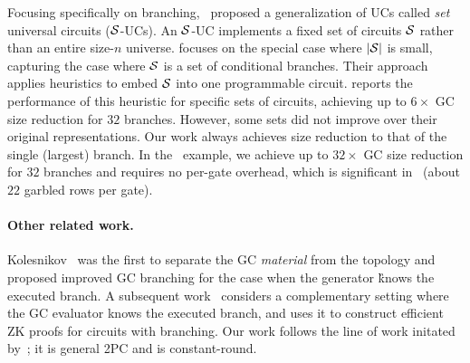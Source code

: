 Focusing specifically on branching,~\cite{AC:KenKolWil17} proposed a generalization of UCs called \emph{set} universal circuits ($\cal S$-UCs).
An $\cal S$-UC implements a fixed set of circuits $\cal S$ rather than an entire size-$n$ universe.
\cite{AC:KenKolWil17} focuses on the special case where $|\cal S|$ is small, capturing the case where $\cal S$ is a set of conditional branches.
Their approach applies heuristics to embed $\cal S$ into one programmable circuit.
\cite{AC:KenKolWil17} reports the performance of this heuristic for specific sets of circuits, achieving up to $6\times$ GC size reduction for $32$ branches.
However, some sets did not improve over their original representations.  Our work always achieves size reduction to that of the single (largest) branch. In the~\cite{AC:KenKolWil17} example, we achieve up to $32\times$ GC size reduction for $32$ branches and requires no per-gate overhead, which is significant  in~\cite{AC:KenKolWil17} (about $22$ garbled rows per gate).  


\paragraph{Other related work.}


Kolesnikov~\cite{AC:Kolesnikov18} was the first to separate the GC {\em material} from the topology and proposed improved GC branching for the case when the generator \G knows the executed branch.  A subsequent work~\cite{EC:HeaKol20} considers a complementary setting where the GC evaluator \E knows the executed branch, and uses it to construct efficient ZK proofs for circuits with branching.
Our work follows the line of work initated by~\cite{AC:Kolesnikov18,EC:HeaKol20}; it is general 2PC and is constant-round.






